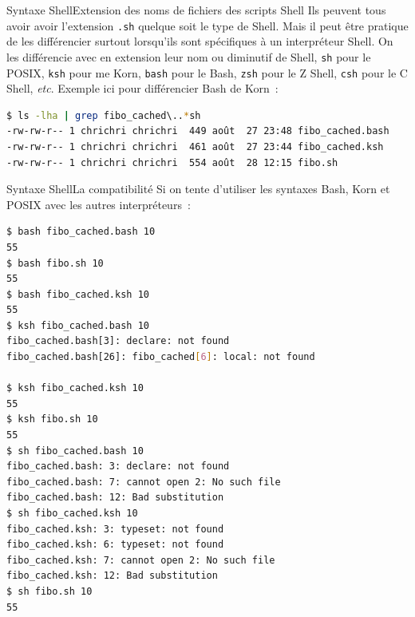 \documentclass{beamer}
\begin{document}
    \begin{frame}[fragile]{Syntaxe Shell}{Extension des noms de fichiers des scripts Shell}
        Ils peuvent tous avoir avoir l'extension \lstinline{.sh} quelque soit le type de Shell.
        \bigbreak
        Mais il peut être pratique de les différencier surtout lorsqu'ils sont spécifiques à un interpréteur Shell.
        On les différencie avec en extension leur nom ou diminutif de Shell, \lstinline{sh} pour le POSIX, \lstinline{ksh} pour me Korn, \lstinline{bash} pour le Bash, \lstinline{zsh} pour le Z Shell, \lstinline{csh} pour le C Shell, \textit{etc}.
        \bigbreak
        Exemple ici pour différencier Bash de Korn~:
        \begin{lstlisting}[language=bash]
$ ls -lha | grep fibo_cached\..*sh
-rw-rw-r-- 1 chrichri chrichri  449 août  27 23:48 fibo_cached.bash
-rw-rw-r-- 1 chrichri chrichri  461 août  27 23:44 fibo_cached.ksh
-rw-rw-r-- 1 chrichri chrichri  554 août  28 12:15 fibo.sh
        \end{lstlisting}
    \end{frame}

    \begin{frame}[fragile]{Syntaxe Shell}{La compatibilité}
        Si on tente d'utiliser les syntaxes Bash, Korn et POSIX avec les autres interpréteurs~:
        \begin{lstlisting}[language=bash,basicstyle=\tiny\ttfamily]
$ bash fibo_cached.bash 10
55
$ bash fibo.sh 10
55
$ bash fibo_cached.ksh 10
55
$ ksh fibo_cached.bash 10
fibo_cached.bash[3]: declare: not found
fibo_cached.bash[26]: fibo_cached[6]: local: not found

$ ksh fibo_cached.ksh 10
55
$ ksh fibo.sh 10
55
$ sh fibo_cached.bash 10
fibo_cached.bash: 3: declare: not found
fibo_cached.bash: 7: cannot open 2: No such file
fibo_cached.bash: 12: Bad substitution
$ sh fibo_cached.ksh 10
fibo_cached.ksh: 3: typeset: not found
fibo_cached.ksh: 6: typeset: not found
fibo_cached.ksh: 7: cannot open 2: No such file
fibo_cached.ksh: 12: Bad substitution
$ sh fibo.sh 10
55
        \end{lstlisting}
    \end{frame}
\end{document}
